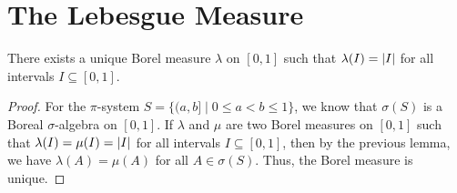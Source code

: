 \section{The Lebesgue Measure}

\begin{theorem}
    There exists a unique Borel measure $\lambda$ on $[0,1]$ such that $\lambda(I) = \left| I \right|$ for all intervals $I \subseteq [0,1]$.
\end{theorem}

\begin{proof}
    For the $\pi$-system $S = \{(a,b] \mid 0 \leq a < b \leq 1\}$, we know that $\sigma(S)$ is a Boreal $\sigma$-algebra on $[0,1]$. If $\lambda$ and $\mu$ are two Borel measures on $[0,1]$ such that $\lambda(I) = \mu(I) = \left| I \right|$ for all intervals $I \subseteq [0,1]$, then by the previous lemma, we have $\lambda(A) = \mu(A)$ for all $A \in \sigma(S)$. Thus, the Borel measure is unique.


\end{proof}
